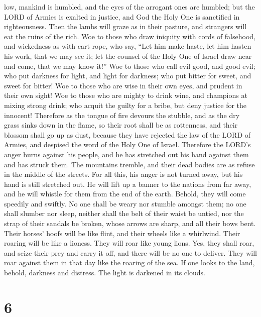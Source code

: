 low, mankind is humbled, and the eyes of the arrogant ones are humbled;
 but the LORD of Armies is exalted in justice, and God the
Holy One is sanctified in righteousness.  Then the lambs
will graze as in their pasture, and strangers will eat the ruins of the
rich.  Woe to those who draw iniquity with cords of
falsehood, and wickedness as with cart rope,  who say,
``Let him make haste, let him hasten his work, that we may see it; let
the counsel of the Holy One of Israel draw near and come, that we may
know it!''  Woe to those who call evil good, and good evil;
who put darkness for light, and light for darkness; who put bitter for
sweet, and sweet for bitter!  Woe to those who are wise in
their own eyes, and prudent in their own sight!  Woe to
those who are mighty to drink wine, and champions at mixing strong
drink;  who acquit the guilty for a bribe, but deny justice
for the innocent!  Therefore as the tongue of fire devours
the stubble, and as the dry grass sinks down in the flame, so their root
shall be as rottenness, and their blossom shall go up as dust, because
they have rejected the law of the LORD of Armies, and despised the word
of the Holy One of Israel.  Therefore the LORD's anger
burns against his people, and he has stretched out his hand against them
and has struck them. The mountains tremble, and their dead bodies are as
refuse in the middle of the streets. For all this, his anger is not
turned away, but his hand is still stretched out.  He will
lift up a banner to the nations from far away, and he will whistle for
them from the end of the earth. Behold, they will come speedily and
swiftly.  No one shall be weary nor stumble amongst them;
no one shall slumber nor sleep, neither shall the belt of their waist be
untied, nor the strap of their sandals be broken,  whose
arrows are sharp, and all their bows bent. Their horses' hoofs will be
like flint, and their wheels like a whirlwind.  Their
roaring will be like a lioness. They will roar like young lions. Yes,
they shall roar, and seize their prey and carry it off, and there will
be no one to deliver.  They will roar against them in that
day like the roaring of the sea. If one looks to the land, behold,
darkness and distress. The light is darkened in its clouds.

\hypertarget{section-5}{%
\section{6}\label{section-5}}

